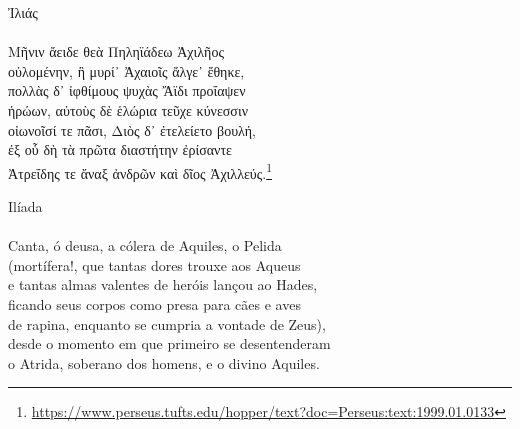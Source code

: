 \clearpage
\thispagestyle{empty}
\noindent{}\Large{Ἰλιάς} \normalsize{} \\
\\
Mῆνιν ἄειδε θεὰ Πηληϊάδεω Ἀχιλῆος \\
οὐλομένην, ἣ μυρί᾽ Ἀχαιοῖς ἄλγε᾽ ἔθηκε, \\
πολλὰς δ᾽ ἰφθίμους ψυχὰς Ἄϊδι προΐαψεν \\
ἡρώων, αὐτοὺς δὲ ἑλώρια τεῦχε κύνεσσιν \\
οἰωνοῖσί τε πᾶσι, Διὸς δ᾽ ἐτελείετο βουλή, \\
ἐξ οὗ δὴ τὰ πρῶτα διαστήτην ἐρίσαντε \\
Ἀτρεΐδης τε ἄναξ ἀνδρῶν καὶ δῖος Ἀχιλλεύς.\footnote{\protect\url{https://www.perseus.tufts.edu/hopper/text?doc=Perseus:text:1999.01.0133}}

\vspace{2cm}
\noindent{}Ilíada\\
\\
Canta, ó deusa, a cólera de Aquiles, o Pelida \\
(mortífera!, que tantas dores trouxe aos Aqueus \\
e tantas almas valentes de heróis lançou ao Hades, \\
ficando seus corpos como presa para cães e aves \\
de rapina, enquanto se cumpria a vontade de Zeus), \\
desde o momento em que primeiro se desentenderam \\
o Atrida, soberano dos homens, e o divino Aquiles.\cite{Iliada}

\hfill
\pagebreak
